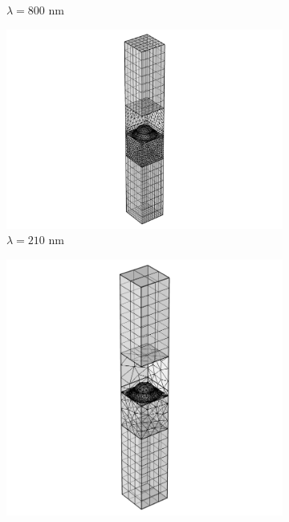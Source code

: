 \begin{figure}[htb]
\begin{subfigure}{.2\textwidth}
        \caption{$\lambda=800$ nm}
        \label{fig:meshDomainHeight_b}
    \end{subfigure}
    \begin{subfigure}{.2\textwidth}
        \centering %
        \includegraphics[scale=0.4, trim=12cm 0cm 12cm 0cm, clip]{figures/ch4/Mesh_210nm_hair=hsub=ax_PMLheight=033wl_max_wl_max=1600_current.png}
        \caption{$\lambda=210$ nm}
        \label{fig:meshDomainHeight_c}
    \end{subfigure}
    \begin{subfigure}{.2\textwidth}
        \centering %
        \includegraphics[scale=0.4, trim=8cm 0cm 8cm 0cm, clip]{figures/ch4/Mesh_800nm_hair=hsub=ax_PMLheight=033wl_max_wl_max=1600_current.png}

\end{subfigure}
\end{figure}
